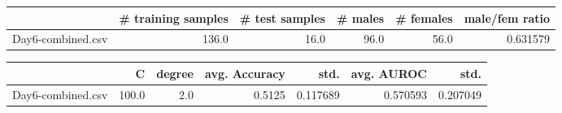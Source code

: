 \begin{tabular}{lrrrrr}
\hline
{} &  \# training samples &  \# test samples &  \# males &  \# females &  male/fem ratio \\
\hline
Day6-combined.csv &               136.0 &            16.0 &     96.0 &       56.0 &        0.631579 \\
\hline
\end{tabular}
\begin{tabular}{lrrrrrr}
\hline
{} &      C &  degree &  avg. Accuracy &      std. &  avg. AUROC &      std. \\
\hline
Day6-combined.csv &  100.0 &     2.0 &         0.5125 &  0.117689 &    0.570593 &  0.207049 \\
\hline
\end{tabular}
